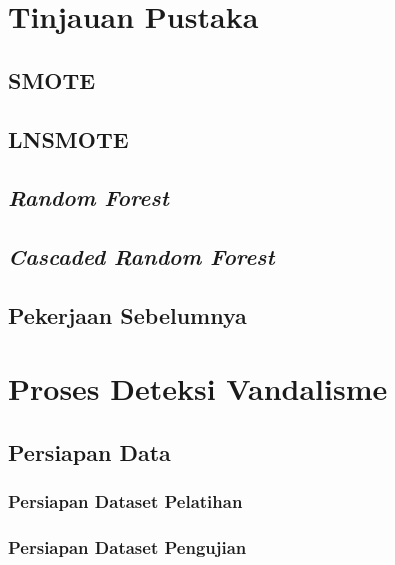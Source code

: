 \documentclass[12pt,a4paper,titlepage]{report}
\begin{document}
\chapter{Tinjauan Pustaka}

\section{SMOTE}


\section{LNSMOTE}


\section{\textit{Random Forest}}


\section{\textit{Cascaded Random Forest}}


\section{Pekerjaan Sebelumnya}


\chapter{Proses Deteksi Vandalisme}


\section{Persiapan Data}
\label{persiapan_data}


\subsection{Persiapan Dataset Pelatihan}


\subsection{Persiapan Dataset Pengujian}

\end{document}
